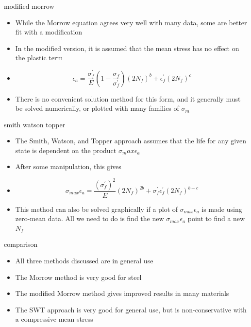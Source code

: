 \documentclass[10pt]{beamer}
\begin{document}
\begin{frame}{modified morrow}
	\begin{itemize}[<+->]
		\item While the Morrow equation agrees very well with many data, some are better fit with a modification
		\item In the modified version, it is assumed that the mean stress has no effect on the plastic term
		\item[] \begin{equation}
		\epsilon_a = \frac{\sigma_f^\prime}{E}\left(1-\frac{\sigma_f}{\sigma_f^\prime}\right)(2N_f)^b + \epsilon_f^\prime (2N_f)^c
		\end{equation}
		\item There is no convenient solution method for this form, and it generally must be solved numerically, or plotted with many families of $\sigma_m$
	\end{itemize}
\end{frame}

\begin{frame}{smith watson topper}
	\begin{itemize}[<+->]
		\item The Smith, Watson, and Topper approach assumes that the life for any given state is dependent on the product $\sigma_max \epsilon_a$
		\item After some manipulation, this gives
		\item[] \begin{equation}
		\sigma_{max} \epsilon_a = \frac{\left(\sigma_f^\prime\right)^2}{E}(2N_f)^{2b} + \sigma_f^\prime \epsilon_f^\prime (2N_f)^{b+c}
		\end{equation}
		\item This method can also be solved graphically if a plot of $\sigma_{max} \epsilon_a$ is made using zero-mean data. All we need to do is find the new $\sigma_{max} \epsilon_a$ point to find a new $N_f$
	\end{itemize}
\end{frame}

\begin{frame}{comparison}
	\begin{itemize}[<+->]
		\item All three methods discussed are in general use
		\item The Morrow method is very good for steel
		\item The modified Morrow method gives improved results in many materials
		\item The SWT approach is very good for general use, but is non-conservative with a compressive mean stress
	\end{itemize}
\end{frame}
\end{document}
